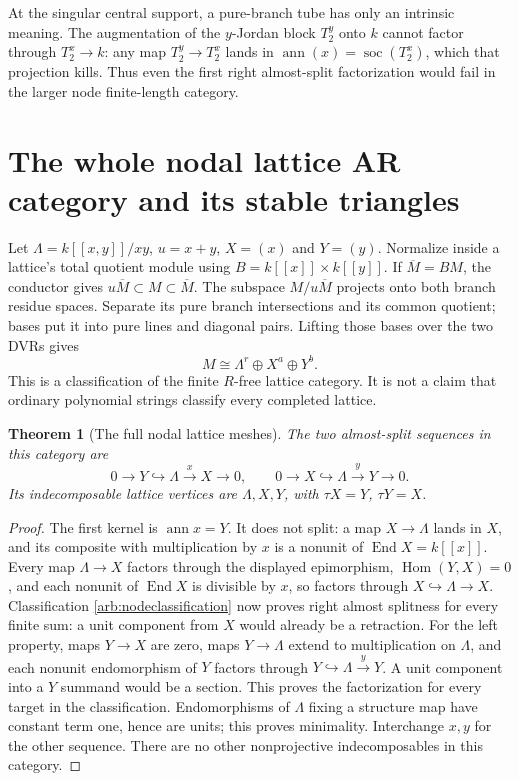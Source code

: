 \documentclass[11pt,oneside,openany]{book}
\newtheorem{theorem}{Theorem}[chapter]
\theoremstyle{definition}\newtheorem{definition}[theorem]{Definition}
\theoremstyle{remark}\newtheorem{remark}[theorem]{Remark}
\begin{document}
At the singular central support, a pure-branch tube has only an intrinsic
meaning. The augmentation of the $y$-Jordan block $T_2^y$ onto $k$ cannot
factor through $T_2^x\to k$: any map $T_2^y\to T_2^x$ lands in
$\operatorname{ann}(x)=\operatorname{soc}(T_2^x)$, which that projection kills.
Thus even the first right almost-split factorization would fail in the larger
node finite-length category.

\section[Nodal lattice AR geometry]{The whole nodal lattice AR category and its stable triangles}
Let $\Lambda=k[[x,y]]/xy$, $u=x+y$, $X=(x)$ and $Y=(y)$. Normalize inside a
lattice's total quotient module using $B=k[[x]]\times k[[y]]$. If
$\overline M=BM$, the conductor gives
$u\overline M\subset M\subset\overline M$. The subspace
$M/u\overline M$ projects onto both branch residue spaces. Separate its pure
branch intersections and its common quotient; bases put it into pure lines
and diagonal pairs. Lifting those bases over the two DVRs gives
\begin{equation}\label{arb:nodeclassification}
 M\cong\Lambda^r\oplus X^a\oplus Y^b.
\end{equation}
This is a classification of the finite $R$-free lattice category. It is not a
claim that ordinary polynomial strings classify every completed lattice.

\begin{theorem}[The full nodal lattice meshes]\label{arb:nodear}
The two almost-split sequences in this category are
\[
 0\to Y\hookrightarrow\Lambda\xrightarrow{x}X\to0,
 \qquad0\to X\hookrightarrow\Lambda\xrightarrow{y}Y\to0.
\]
Its indecomposable lattice vertices are $\Lambda,X,Y$, with $\tau X=Y$, $\tau Y=X$.
\end{theorem}
\begin{proof}
The first kernel is $\operatorname{ann}x=Y$. It does not split: a map
$X\to\Lambda$ lands in $X$, and its composite with multiplication by $x$
is a nonunit of $\operatorname{End}X=k[[x]]$. Every map $\Lambda\to X$
factors through the displayed epimorphism, $\operatorname{Hom}(Y,X)=0$,
and each nonunit of $\operatorname{End}X$ is divisible by $x$, so factors
through $X\hookrightarrow\Lambda\to X$. Classification
\eqref{arb:nodeclassification} now proves right almost splitness for every
finite sum: a unit component from $X$ would already be a retraction.
For the left property, maps $Y\to X$ are zero, maps $Y\to\Lambda$
extend to multiplication on $\Lambda$, and each nonunit endomorphism of
$Y$ factors through $Y\hookrightarrow\Lambda\xrightarrow{y}Y$.
A unit component into a $Y$ summand would be a section. This proves the
factorization for every target in the classification. Endomorphisms of
$\Lambda$ fixing a structure map have constant term one, hence are units;
this proves minimality.
Interchange $x,y$ for the other sequence. There are no other nonprojective
indecomposables in this category.
\end{proof}
\end{document}
